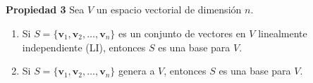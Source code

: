 
\subsection{}

{\nologo
\begin{frame}%

\begin{prop}{\textbf{Propiedad 3}}\justifying
	Sea $V$ un espacio vectorial de dimensión $n$. 
	\begin{enumerate}
		\item[\labelname{$a$}] Si $S=\{\mathbf{v}_1, \mathbf{v}_2, \hdots , \mathbf{v}_n \}$ es un conjunto de vectores en $V$ 
		linealmente independiente (LI), entonces $S$ es una base para $V$.
		\item[\labelname{$b$}] Si $S=\{\mathbf{v}_1, \mathbf{v}_2, \hdots , \mathbf{v}_n \}$ genera a $V$,
		entonces $S$ es una base para $V$.
	\end{enumerate}
\end{prop}	



\end{frame}}
